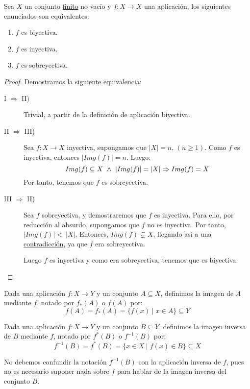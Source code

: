 \begin{prop}\label{prop:ConjFinito_Equivalencias}
    Sea $X$ un conjunto \ul{finito} no vacío y $f:X \rightarrow X$ una aplicación, los siguientes enunciados
    son equivalentes:
    \begin{enumerate}[label=\roman*.]
        \item $f$ es biyectiva.
        \item $f$ es inyectiva.
        \item $f$ es sobreyectiva.
    \end{enumerate}
\end{prop}
\begin{proof} Demostramos la siguiente equivalencia:
\begin{description} 
    \item[I $\Longrightarrow$ II)] Trivial, a partir de la definición de aplicación biyectiva.
    
    \item[II $\Longrightarrow$ III)] Sea $f:X \rightarrow X$ inyectiva, supongamos que $|X| = n$, $(n \geq 1)$. Como $f$ es inyectiva, entonces $|Img(f)| = n$. Luego:
    $$Img(f) \subseteq X \ \land \  |Img(f)| = |X| \Rightarrow Img(f) = X$$
    Por tanto, tenemos que $f$ es sobreyectiva.

    \item[III $\Longrightarrow$ II)] Sea $f$ sobreyectiva, y demostraremos que $f$ es inyectiva. Para ello, por reducción al absurdo, supongamos que $f$ no es inyectiva. Por tanto, $|Img(f)|<~|X|$. Entonces, $Img(f) \subsetneq X$, llegando así a una \underline{contradicción}, ya que $f$ era sobreyectiva.
    
    Luego $f$ es inyectiva y como era sobreyectiva, tenemos que es biyectiva.
\end{description}
\end{proof}

\begin{definicion}
    Dada una aplicación ${f:X\rightarrow Y}$ y un conjunto $A\subseteq X$, definimos la imagen de $A$ mediante $f$, notado por $f_*(A)$ o $f(A)$ por:
    \begin{equation*}
        f(A) = f_*(A) = \{f(x) \mid x \in A\} \subseteq Y
    \end{equation*}
\end{definicion}

\begin{definicion}
    Dada una aplicación $f:X\rightarrow Y$ y un conjunto $B\subseteq Y$, definimos la imagen inversa de $B$ mediante $f$, notado por $f^*(B)$ o $f^{-1}(B)$ por:
    \begin{equation*}
        f^{-1}(B) = f^*(B) = \{x \in X \mid f(x) \in B\} \subseteq X
    \end{equation*}
\end{definicion}
No debemos confundir la notación $f^{-1}(B)$ con la aplicación inversa de $f$, pues no es necesario suponer nada sobre $f$ para hablar de la imagen inversa del conjunto $B$.

